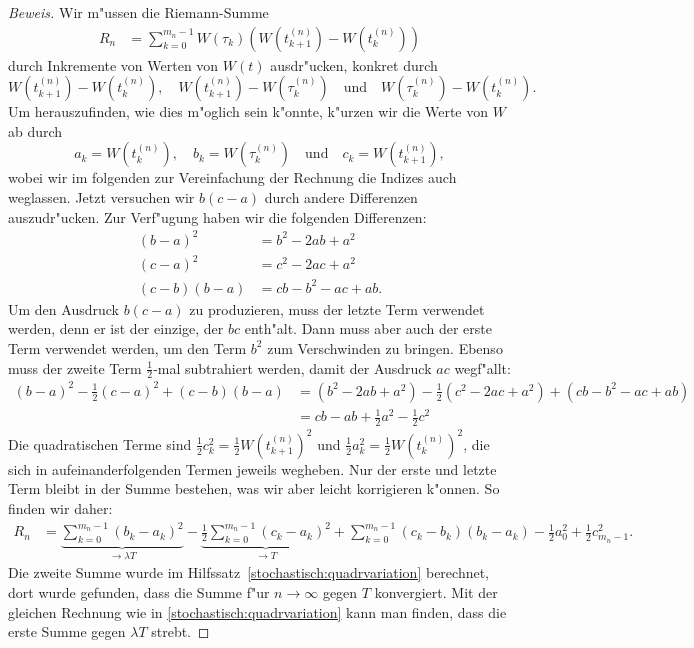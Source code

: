\begin{proof}[Beweis]
Wir m"ussen die Riemann-Summe
\begin{align*}
R_n
&=
\sum_{k=0}^{m_n-1}
W(\tau_k) (W(t_{k+1}^{(n)})-W(t_k^{(n)}))
\end{align*}
durch Inkremente von Werten von $W(t)$ ausdr"ucken, konkret durch
\[
W(t_{k+1}^{(n)})-W(t_k^{(n)}),\quad
W(t_{k+1}^{(n)})-W(\tau_k^{(n)})
\quad \text{und} \quad
W(\tau_k^{(n)})-W(t_k^{(n)}).
\]
Um herauszufinden, wie dies m"oglich sein k"onnte, k"urzen wir die Werte
von $W$ ab durch
\[
a_k=W(t_k^{(n)}),\quad
b_k=W(\tau_k^{(n)})\quad\text{und}\quad
c_k=W(t_{k+1}^{(n)}),
\]
wobei wir im folgenden zur Vereinfachung der Rechnung die Indizes auch
weglassen.
Jetzt versuchen wir $b(c-a)$ durch andere Differenzen auszudr"ucken.
Zur Verf"ugung haben wir die folgenden Differenzen:
\begin{align*}
(b-a)^2
&=
b^2-2ab + a^2
\\
(c-a)^2
&=
c^2-2ac+a^2
\\
(c-b)(b-a)
&=
cb-b^2-ac+ab.
\end{align*}
Um den Ausdruck $b(c-a)$ zu produzieren, muss der letzte Term verwendet
werden, denn er ist der einzige, der $bc$ enth"alt.
Dann muss aber auch der erste Term verwendet werden, um den Term $b^2$ zum
Verschwinden  zu bringen.
Ebenso muss der zweite Term $\frac12$-mal subtrahiert werden, damit der
Ausdruck $ac$ wegf"allt:
\begin{align*}
(b-a)^2-\frac12(c-a)^2+(c-b)(b-a)
&=
(b^2-2ab + a^2)
-\frac12(c^2-2ac+a^2)
+(cb-b^2-ac+ab)
\\
&=
cb-ab + \frac12a^2
-\frac12c^2
\end{align*}
Die quadratischen Terme sind $\frac12c_k^2=\frac12W(t_{k+1}^{(n)})^2$ und
$\frac12a_k^2=\frac12W(t_{k}^{(n)})^2$, die sich in aufeinanderfolgenden Termen
jeweils wegheben.
Nur der erste und letzte Term bleibt in der Summe bestehen, was wir
aber leicht korrigieren k"onnen.
So finden wir daher:
\begin{align*}
R_n
&=
\underbrace{
\sum_{k=0}^{m_n-1} (b_k-a_k)^2
}_{\textstyle\to\lambda T}
-
\underbrace{
\frac12\sum_{k=0}^{m_n-1} (c_k-a_k)^2
}_{\textstyle\to T}
+\sum_{k=0}^{m_n-1} (c_k-b_k)(b_k-a_k)
- \frac12a_0^2
+ \frac12c_{m_n-1}^2.
\end{align*}
Die zweite Summe wurde im Hilfssatz~\ref{stochastisch:quadrvariation}
berechnet, dort wurde gefunden, dass die Summe f"ur $n\to\infty$ gegen $T$
konvergiert.
Mit der gleichen Rechnung wie in \ref{stochastisch:quadrvariation}
kann man finden, dass die erste Summe gegen $\lambda T$ strebt.


\end{proof}
